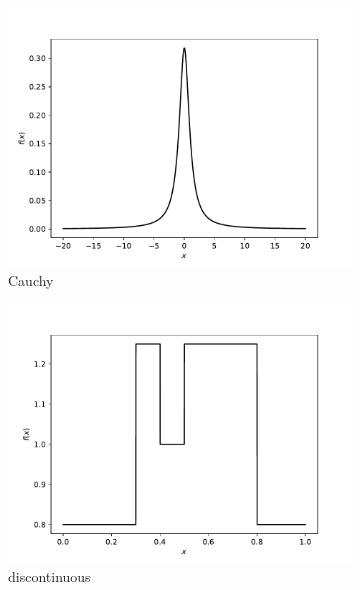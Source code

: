 \documentclass{article}
\begin{document}
\begin{figure}[htb]
\medskip
\begin{subfigure}{0.333\textwidth}
  \includegraphics[width=\linewidth]{benchmark_distributions/cauchy.pdf}
  \caption{Cauchy}
  \label{fig:cauchy}
\end{subfigure}\hfil %
\begin{subfigure}{0.333\textwidth}
  \includegraphics[width=\linewidth]{benchmark_distributions/discontinuous.pdf}
  \caption{discontinuous}
  \label{fig:discontinuous}
\end{subfigure}\hfil %
\begin{subfigure}{0.333\textwidth}

\end{subfigure}
\end{figure}
\end{document}

